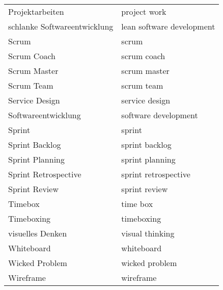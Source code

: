 \begin{spacing}{.5}
\begin{longtable}{ p{} p{}}
    Projektarbeiten & project work \\
    schlanke Softwareentwicklung & lean software development \\
    Scrum & scrum \\
    Scrum Coach & scrum coach \\
    Scrum Master & scrum master \\
    Scrum Team & scrum team \\
    Service Design & service design \\
    Softwareentwicklung & software development \\
    Sprint & sprint \\
    Sprint Backlog & sprint backlog \\
    Sprint Planning & sprint planning \\
    Sprint Retrospective & sprint retrospective \\
    Sprint Review & sprint review \\
    Timebox & time box \\
    Timeboxing & timeboxing \\
    visuelles Denken & visual thinking \\
    Whiteboard & whiteboard \\
    Wicked Problem & wicked problem \\
    Wireframe & wireframe \\
\end{longtable}
\endgroup
\end{spacing}


